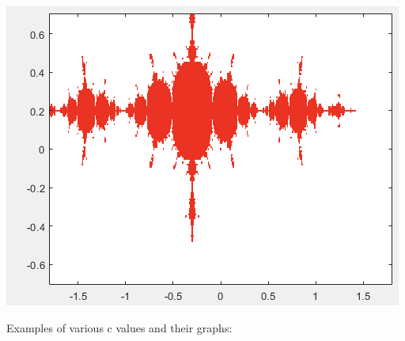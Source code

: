\documentclass[11pt]{article}
\theoremstyle{plain}
\theoremstyle{definition}
\begin{document}
\begin{center}
	\includegraphics*[scale = 0.5]{Plot2.png}\vspace{5cm}
\end{center}

Examples of various c values and their graphs: \\
\end{document}
